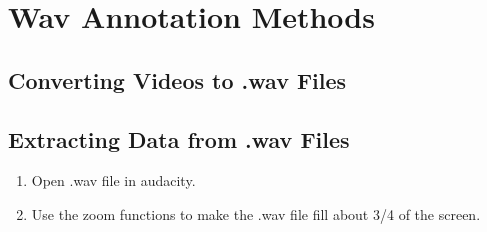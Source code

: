 \documentclass[11 pt]{article}
\begin{document}
\section{Wav Annotation Methods}
\subsection{Converting Videos to .wav Files}
\subsection{Extracting Data from .wav Files}
\begin{enumerate}
\item{Open .wav file in audacity.}
\item{Use the zoom functions to make the .wav file fill about 3/4 of the screen.}
\end{enumerate}
\end{document}

